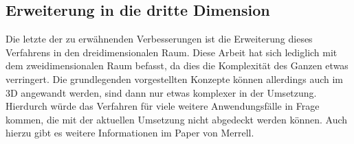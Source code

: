 \subsection{Erweiterung in die dritte Dimension}
Die letzte der zu erwähnenden Verbesserungen ist die Erweiterung dieses Verfahrens in den dreidimensionalen Raum. Diese Arbeit hat sich
lediglich mit dem zweidimensionalen Raum befasst, da dies die Komplexität des Ganzen etwas verringert. Die grundlegenden vorgestellten
Konzepte können allerdings auch im 3D angewandt werden, sind dann nur etwas komplexer in der Umsetzung. Hierdurch würde das Verfahren
für viele weitere Anwendungsfälle in Frage kommen, die mit der aktuellen Umsetzung nicht abgedeckt werden können. Auch hierzu gibt es
weitere Informationen im Paper von Merrell. \cite{1_merrell}

